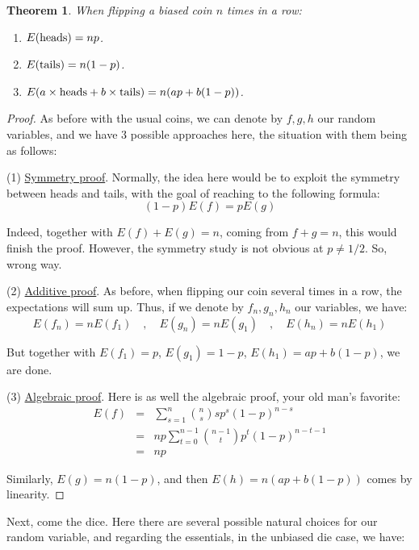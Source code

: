 \documentclass[12pt]{amsbook}
\newtheorem{theorem}{Theorem}[chapter]
\begin{document}
\begin{theorem}
When flipping a biased coin $n$ times in a row:
\begin{enumerate}
\item $E({\rm heads})=np$.

\item $E({\rm tails})=n(1-p)$.

\item $E(a\times{\rm heads}+b\times{\rm tails})=n(ap+b(1-p))$.
\end{enumerate} 
\end{theorem}

\begin{proof}
As before with the usual coins, we can denote by $f,g,h$ our random variables, and we have 3 possible approaches here, the situation with them being as follows:

\medskip

(1) \underline{Symmetry proof}. Normally, the idea here would be to exploit the symmetry between heads and tails, with the goal of reaching to the following formula:
$$(1-p)E(f)=pE(g)$$

Indeed, together with $E(f)+E(g)=n$, coming from $f+g=n$, this would finish the proof. However, the symmetry study is not obvious at $p\neq1/2$. So, wrong way. 

\medskip

(2) \underline{Additive proof}. As before, when flipping our coin several times in a row, the expectations will sum up. Thus, if we denote by $f_n,g_n,h_n$ our variables, we have:
$$E(f_n)=nE(f_1)\quad,\quad E(g_n)=nE(g_1)\quad,\quad E(h_n)=nE(h_1)$$

But together with $E(f_1)=p$, $E(g_1)=1-p$, $E(h_1)=ap+b(1-p)$, we are done.

\medskip

(3) \underline{Algebraic proof}. Here is as well the algebraic proof, your old man's favorite:
\begin{eqnarray*}
E(f)
&=&\sum_{s=1}^n\binom{n}{s}sp^s(1-p)^{n-s}\\
&=&np\sum_{t=0}^{n-1}\binom{n-1}{t}p^t(1-p)^{n-t-1}\\
&=&np
\end{eqnarray*}

Similarly, $E(g)=n(1-p)$, and then $E(h)=n(ap+b(1-p))$ comes by linearity.
\end{proof}

Next, come the dice. Here there are several possible natural choices for our random variable, and regarding the essentials, in the unbiased die case, we have:
\end{document}
